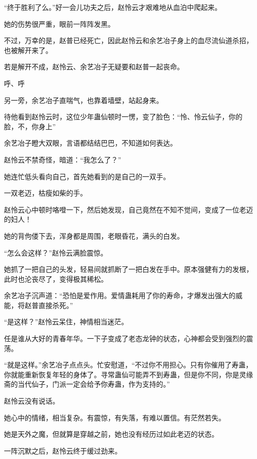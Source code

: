 
\begin{this_body}

“终于胜利了么。”好一会儿功夫之后，赵怜云才艰难地从血泊中爬起来。

她的伤势很严重，眼前一阵阵发黑。

不过，万幸的是，赵普已经死亡，因此赵怜云和余艺冶子身上的血尽流仙道杀招，也被解开来了。

若是解开不成，赵怜云、余艺冶子无疑要和赵普一起丧命。

呼、呼

另一旁，余艺冶子直喘气，也靠着墙壁，站起身来。

待他看到赵怜云时，这位少年蛊仙顿时一愣，变了脸色：“怜、怜云仙子，你的脸，不，你身上”

余艺冶子瞪大双眼，言语都结结巴巴，不知道如何表达。

赵怜云不禁奇怪，暗道：“我怎么了？”

她连忙低头看向自己，首先她看到的是自己的一双手。

一双老迈，枯瘦如柴的手。

赵怜云心中顿时咯噔一下，然后她发现，自己竟然在不知不觉间，变成了一位老迈的妇人！

她的背佝偻下去，浑身都是周围，老眼昏花，满头的白发。

“怎么会这样？”赵怜云满脸震惊。

她抓了一把自己的头发，轻易间就抓断了一把白发在手中。原本强健有力的发根，此时也沦丧尽了，变得极其稀松。

余艺冶子沉声道：“恐怕是爱作用。爱情蛊耗用了你的寿命，才爆发出强大的威能，将赵普直接杀死。”

“是这样？”赵怜云呆住，神情相当迷茫。

任是谁从大好的青春年华。一下子变成了老态龙钟的状态，心神都会受到强烈的震荡。

“就是这样。”余艺冶子点点头。忙安慰道，“不过你不用担心。只有你催用了寿蛊，你就能重新恢复年轻的身体了。寻常蛊仙可能弄不到寿蛊，但是你不同，你是灵缘斋的当代仙子，门派一定会给予你寿蛊，作为支持的。”

赵怜云没有说话。

她心中的情绪，相当复杂。有震惊，有失落，有难以置信。有茫然若失。

她是天外之魔，但就算是穿越之前，她也没有经历过如此老迈的状态。

一阵沉默之后，赵怜云终于缓过劲来。


\end{this_body}
